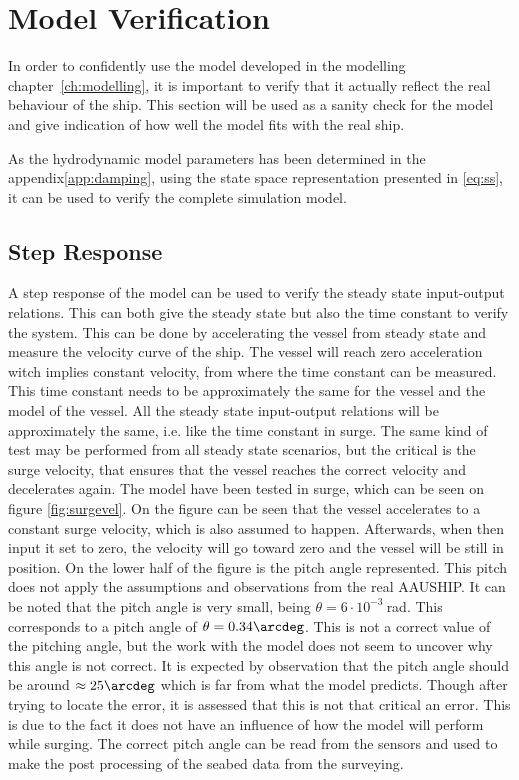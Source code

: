 \section{Model Verification}
\label{sec:model_verification}
In order to confidently use the model developed in the modelling chapter~\vref{ch:modelling}, it is important to verify that it actually reflect the real behaviour of the ship. This section will be used as a sanity check for the model and give indication of how well the model fits with the real ship.

As the hydrodynamic model parameters has been determined in the appendix\vref{app:damping}, using the state space representation presented in \vref{eq:ss}, it can be used to verify the complete simulation model.

\subsection{Step Response}
A step response of the model can be used to verify the steady state input-output relations. This can both give the steady state but also the time constant to verify the system. This can be done by accelerating the vessel from steady state and measure the velocity curve of the ship. The vessel will reach zero acceleration witch implies constant velocity, from where the time constant can be measured. This time constant needs to be approximately the same for the vessel and the model of the vessel. All the steady state input-output relations will be approximately the same, i.e. like the time constant in surge. The same kind of test may be performed from all steady state scenarios, but the critical is the surge velocity, that ensures that the vessel reaches the correct velocity and decelerates again. The model have been tested in surge, which can be seen on figure \ref{fig:surgevel}. On the figure can be seen that the vessel accelerates to a constant surge velocity, which is also assumed to happen. Afterwards, when then input it set to zero, the velocity will go toward zero and the vessel will be still in position. On the lower half of the figure is the pitch angle represented. This pitch does not apply the assumptions and observations from the real AAUSHIP. It can be noted that the pitch angle is very small, being $\theta = 6\cdot 10^{-3}\ $rad. This corresponds to a pitch angle of $\theta = 0.34\arcdeg$. This is not a correct value of the pitching angle, but the work with the model does not seem to uncover why this angle is not correct. It is expected by observation that the pitch angle should be around $\approx 25 \arcdeg$ which is far from what the model predicts. Though after trying to locate the error, it is assessed that this is not that critical an error. This is due to the fact it does not have an influence of how the model will perform while surging. The correct pitch angle can be read from the sensors and used to make the post processing of the seabed data from the surveying.
